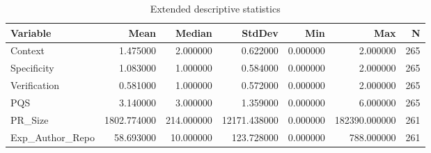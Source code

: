 \begin{table}
\caption{Extended descriptive statistics}
\label{tab:effect-sizes}
\begin{tabular}{lrrrrrr}
\toprule
Variable & Mean & Median & StdDev & Min & Max & N \\
\midrule
Context & 1.475000 & 2.000000 & 0.622000 & 0.000000 & 2.000000 & 265 \\
Specificity & 1.083000 & 1.000000 & 0.584000 & 0.000000 & 2.000000 & 265 \\
Verification & 0.581000 & 1.000000 & 0.572000 & 0.000000 & 2.000000 & 265 \\
PQS & 3.140000 & 3.000000 & 1.359000 & 0.000000 & 6.000000 & 265 \\
PR_Size & 1802.774000 & 214.000000 & 12171.438000 & 0.000000 & 182390.000000 & 261 \\
Exp_Author_Repo & 58.693000 & 10.000000 & 123.728000 & 0.000000 & 788.000000 & 261 \\
\bottomrule
\end{tabular}
\end{table}
